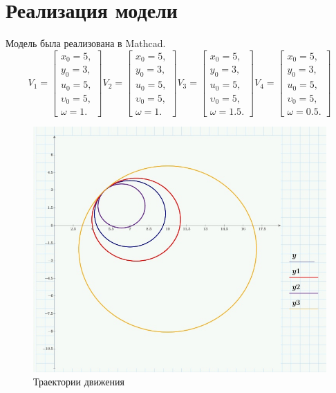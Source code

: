 \documentclass[a4paper, 14pt]{extarticle}
\begin{document}
	\section{Реализация модели}
		Модель была реализована в Mathcad.
		\[
		V_1 = \begin{bmatrix}x_0=5,\\y_0=3,\\u_0=5,\\\upsilon_0=5,\\\omega=1.\end{bmatrix}
		V_2 = \begin{bmatrix}x_0=5,\\y_0=3,\\u_0=5,\\\upsilon_0=5,\\\omega=1.\end{bmatrix}
		V_3 = \begin{bmatrix}x_0=5,\\y_0=3,\\u_0=5,\\\upsilon_0=5,\\\omega=1.5.\end{bmatrix}
		V_4 = \begin{bmatrix}x_0=5,\\y_0=3,\\u_0=5,\\\upsilon_0=5,\\\omega=0.5.\end{bmatrix}
		\]
		\begin{figure}[H]
			\centering
			\includegraphics[width = \linewidth]{1.jpg}
			\caption{Траектории движения}
		\end{figure}
\end{document}
